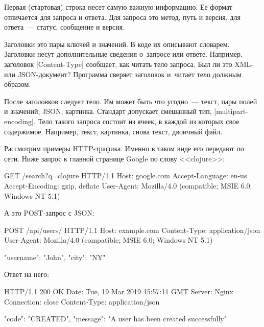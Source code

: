 Первая (стартовая) строка несет самую важную информацию. Ее формат отличается
для запроса и ответа. Для запроса это метод, путь и версия, для ответа~---
статус, сообщение и версия.

Заголовки это пары ключей и значений. В коде их описывают словарем. Заголовки
несут дополнительные сведения о~запросе или ответе. Например, заголовок
\spverb|Content-Type| сообщает, как читать тело запроса. Был ли это XML- или
JSON-документ? Программа сверяет заголовок и~читает тело должным образом.

После заголовков следует тело. Им может быть что угодно~--- текст, пары полей и
значений, JSON, картинка. Стандарт допускает смешанный тип,
\spverb|multipart-encoding|. Тело такого запроса состоит из ячеек, в каждой из
которых свое содержимое. Например, текст, картинка, снова текст, двоичный файл.

Рассмотрим примеры HTTP-трафика. Именно в таком виде его передают по сети. Ниже
запрос к главной странице Google по слову <<clojure>>:

\begin{english}
  \begin{http}
GET /search?q=clojure HTTP/1.1
Host: google.com
Accept-Language: en-us
Accept-Encoding: gzip, deflate
User-Agent: Mozilla/4.0 (compatible; MSIE 6.0; Windows NT 5.1)
  \end{http}
\end{english}

\noindent
А это POST-запрос с JSON:

\begin{english}
  \begin{http}
POST /api/users/ HTTP/1.1
Host: example.com
Content-Type: application/json
User-Agent: Mozilla/4.0 (compatible; MSIE 6.0; Windows NT 5.1)

{
  "username": "John",
  "city": "NY"
}
  \end{http}
\end{english}

\noindent
Ответ на него:

\begin{english}
  \begin{http}
HTTP/1.1 200 OK
Date: Tue, 19 Mar 2019 15:57:11 GMT
Server: Nginx
Connection: close
Content-Type: application/json

{
  "code": "CREATED",
  "message": "A user has been created successfully"
}
  \end{http}
\end{english}

